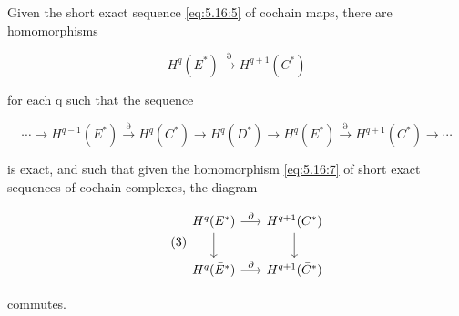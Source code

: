 \begin{proposition}\label{thm:5.17}
Given the short exact sequence \eqref{eq:5.16:5} of cochain maps, there are homomorphisms

\begin{equation}
\tag{1}\label{eq:5.17:1}
H^{q}(E^{*})\xrightarrow{\partial}H^{q+1}(C^{*})
\end{equation}

for each q such that the sequence

\begin{equation}
\tag{2}\label{eq:5.17:2}
\cdots\to H^{q-1}(E^{*})\xrightarrow{\partial}H^{q}(C^{*})\to H^{q}(D^{*})\to H^{q}(E^{*})\xrightarrow{\partial}H^{q+1}(C^{*})\to\cdots
\end{equation}

is exact, and such that given the homomorphism \eqref{eq:5.16:7} of short exact sequences of cochain complexes, the diagram

\begin{equation}
\tag{3}\label{eq:5.17:3}
\begin{tikzcd}[ampersand replacement=\&, column sep=1.6em,row sep=2em]
H^q(E^*) \arrow[r ,"{\partial}"] \arrow[d] \& H^{q+1}(C^*) \arrow[d] \\
H^q(\bar E^*) \arrow[r ,"{\partial}"] \& H^{q+1}(\bar C^*)
\end{tikzcd}
\end{equation}

commutes.

\end{proposition}

